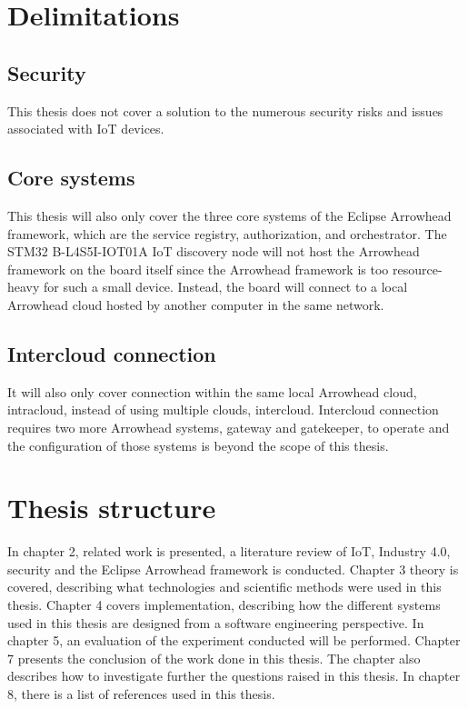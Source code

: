 \section{Delimitations}
\subsection{Security}
This thesis does not cover a solution to the numerous security risks and issues associated with IoT devices. 
\subsection{Core systems}
This thesis will also only cover the three core systems of the Eclipse Arrowhead framework, which are the service registry, authorization, and orchestrator. 
The STM32 B-L4S5I-IOT01A IoT discovery node will not host the Arrowhead framework on the board itself since the Arrowhead framework is too resource-heavy for such a small device.
Instead, the board will connect to a local Arrowhead cloud hosted by another computer in the same network. 
\subsection{Intercloud connection}
It will also only cover connection within the same local Arrowhead cloud, intracloud, instead of using multiple clouds, intercloud.
Intercloud connection requires two more Arrowhead systems, gateway and gatekeeper, to operate and the configuration of those systems is beyond the scope of this thesis.
\section{Thesis structure}
In chapter 2, related work is presented, a literature review of IoT, Industry 4.0, security and the Eclipse Arrowhead framework is conducted. 
Chapter 3 theory is covered, describing what technologies and scientific methods were used in this thesis.
Chapter 4 covers implementation, describing how the different systems used in this thesis are designed from a software engineering perspective.
In chapter 5, an evaluation of the experiment conducted will be performed. 
Chapter 7 presents the conclusion of the work done in this thesis. The chapter also describes how to investigate further the questions raised in this thesis. 
In chapter 8, there is a list of references used in this thesis.
